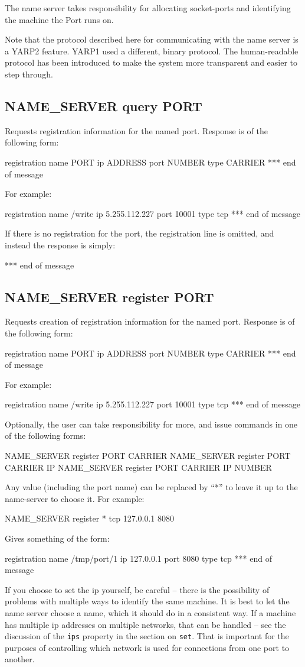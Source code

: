 \documentclass[a4]{article}
\newenvironment{codecase}[1]{\subsection{#1}}{}
\begin{document}
The name server takes responsibility for allocating
socket-ports and identifying the machine the Port runs on.

Note that the protocol described here for communicating with the name
server is a YARP2 feature.  YARP1 used a different, binary protocol.
The human-readable protocol has been introduced to make the system
more transparent and easier to step through.

\begin{codecase}{NAME\_SERVER query PORT}
Requests registration information for the named port.  Response is of 
the following form:
\begin{code}
registration name PORT ip ADDRESS port NUMBER type CARRIER
*** end of message
\end{code}
For example:
\begin{code}
registration name /write ip 5.255.112.227 port 10001 type tcp
*** end of message
\end{code}
If there is no registration for the port, the registration line
is omitted, and instead the response is simply:
\begin{code}
*** end of message
\end{code}
\end{codecase}


\begin{codecase}{NAME\_SERVER register PORT}

Requests creation of registration information for the named port.  
Response is of the following form:
\begin{code}
registration name PORT ip ADDRESS port NUMBER type CARRIER
*** end of message
\end{code}
For example:
\begin{code}
registration name /write ip 5.255.112.227 port 10001 type tcp
*** end of message
\end{code}
%
Optionally, the user can take responsibility for more, and 
issue commands in one of the following forms:
\begin{code}
NAME_SERVER register PORT CARRIER
NAME_SERVER register PORT CARRIER IP
NAME_SERVER register PORT CARRIER IP NUMBER
\end{code}
Any value (including the port name) can be replaced by ``*'' to leave it 
up to the name-server to choose it.  For example:
\begin{code}
NAME_SERVER register * tcp 127.0.0.1 8080
\end{code}
Gives something of the form:
\begin{code}
registration name /tmp/port/1 ip 127.0.0.1 port 8080 type tcp
*** end of message
\end{code}
If you choose to set the ip yourself, be careful -- there is the 
possibility of problems with multiple ways to identify the same
machine.  It is best to let the name server choose a name,
which it should do in a consistent way.  If a machine has
multiple ip addresses on multiple networks, that can be 
handled -- see the 
discussion of the {\tt ips} property in the section on {\tt set}.
That is important for the purposes of controlling which 
network is used for connections from one port to another.


\end{codecase}
\end{document}
